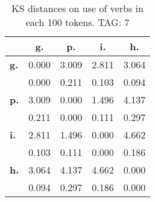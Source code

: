 \begin{table}[h!]
\begin{center}
\begin{tabular}{| l || c | c | c | c |}\hline
 & {\bf g.} & {\bf p.} & {\bf i.} & {\bf h.} \\\hline\hline
{\bf g.} & 0.000 & 3.009 & 2.811 & 3.064 \\
{\bf } & 0.000 & 0.211 & 0.103 & 0.094 \\\hline
{\bf p.} & 3.009 & 0.000 & 1.496 & 4.137 \\
{\bf } & 0.211 & 0.000 & 0.111 & 0.297 \\\hline
{\bf i.} & 2.811 & 1.496 & 0.000 & 4.662 \\
{\bf } & 0.103 & 0.111 & 0.000 & 0.186 \\\hline
{\bf h.} & 3.064 & 4.137 & 4.662 & 0.000 \\
{\bf } & 0.094 & 0.297 & 0.186 & 0.000 \\\hline
\end{tabular}
\caption{KS distances on use of verbs in each 100 tokens. TAG: 7}
\end{center}
\end{table}